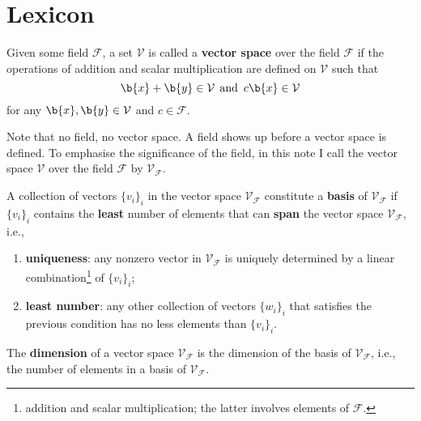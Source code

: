 \section{Lexicon}


\begin{definition} 
\label{def:vector-space}
Given some field $\mathcal{F}$, a set $\mathcal{V}$ is called a \textbf{vector space} over the field $\mathcal{F}$ if the operations of addition and scalar multiplication are defined on $\mathcal{V}$ such that 
$$ \b{x} + \b{y} \in \mathcal{V} \>\> \text{and} \,\,\, c\b{x} \in \mathcal{V}$$
for any $ \b{x}, \b{y} \in \mathcal{V}$ and $c \in \mathcal{F}$. 
\end{definition}

Note that no field, no vector space.
A field shows up before a vector space is defined.
To emphasise the significance of the field, in this note I call the vector space $\mathcal{V}$ over the field $\mathcal{F}$ by $\mathcal{V}_{\mathcal{F}}$.

\begin{definition}
A collection of vectors $\{v_i\}_i$ in the vector space $\mathcal{V}_{\mathcal{F}}$ constitute a \textbf{basis} of $\mathcal{V}_{\mathcal{F}}$ if $\{v_i\}_i$ contains the \textbf{least} number of elements that can \textbf{span} the vector space $\mathcal{V}_{\mathcal{F}}$, i.e., 
\begin{enumerate}
    \item \textbf{uniqueness}: any nonzero vector in $\mathcal{V}_{\mathcal{F}}$ is uniquely determined by a linear combination\footnote{addition and scalar multiplication; the latter involves elements of $\mathcal{F}$.} of $\{v_i\}_i$;
    \item \textbf{least number}: any other collection of vectors $\{w_i\}_i$ that satisfies the previous condition has no less elements than $\{v_i\}_i$.
\end{enumerate}
\end{definition}

\begin{definition}
The \textbf{dimension} of a vector space $\mathcal{V}_{\mathcal{F}}$ is the dimension of the basis of $\mathcal{V}_{\mathcal{F}}$, i.e., the number of elements in a basis of $\mathcal{V}_{\mathcal{F}}$.
\end{definition}



